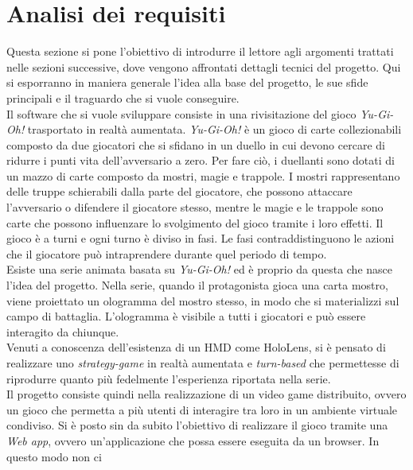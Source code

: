 \section{Analisi dei requisiti}\label{sec:Analisi}
    Questa sezione si pone l'obiettivo di introdurre il lettore agli argomenti trattati nelle sezioni successive, dove vengono affrontati dettagli tecnici del progetto. Qui si esporranno
    in maniera generale l'idea alla base del progetto, le sue sfide principali e il traguardo che si vuole conseguire.\\
    \newline
    Il software che si vuole sviluppare consiste in una rivisitazione del gioco \textit{Yu-Gi-Oh!} trasportato in realtà aumentata. \textit{Yu-Gi-Oh!} è un gioco di 
    carte collezionabili composto da due giocatori che si sfidano in un duello in cui devono cercare di ridurre i punti vita dell'avversario a zero. Per fare ciò, i duellanti sono dotati di un
    mazzo di carte composto da mostri, magie e trappole. I mostri rappresentano delle truppe schierabili dalla parte del giocatore, che possono attaccare l'avversario o difendere il
    giocatore stesso, mentre le magie e le trappole sono carte che possono influenzare lo svolgimento del gioco tramite i loro effetti. Il gioco è a turni e ogni turno è diviso in fasi. Le 
    fasi contraddistinguono le azioni che il giocatore può intraprendere durante quel periodo di tempo.\\
    \newline
    Esiste una serie animata basata su \textit{Yu-Gi-Oh!} ed è proprio da questa che nasce l'idea del progetto. Nella serie, quando il protagonista gioca una carta mostro, 
    viene proiettato un ologramma del mostro stesso, in modo che si materializzi sul campo di battaglia. L'ologramma è visibile a tutti i giocatori e può essere interagito da chiunque.\\
    Venuti a conoscenza dell'esistenza di un HMD come HoloLens, si è pensato di realizzare uno \textit{strategy-game} in realtà aumentata e \textit{turn-based} che permettesse di riprodurre 
    quanto più fedelmente l'esperienza riportata nella serie.\\
    \newline
    Il progetto consiste quindi nella realizzazione di un video game distribuito, ovvero un gioco che permetta a più utenti di interagire tra loro in un ambiente virtuale condiviso. 
    Si è posto sin da subito l'obiettivo di realizzare il gioco tramite una \textit{Web app}, ovvero un'applicazione che possa essere eseguita da un browser. In questo modo non ci 
